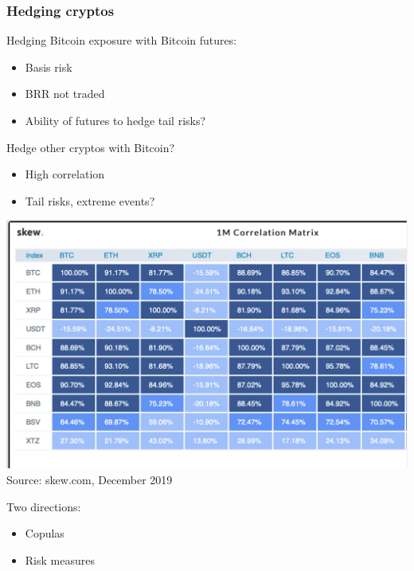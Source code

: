 \documentclass[10pt,mathserif]{beamer}
\renewcommand{\(}{\begin{columns}}
\renewcommand{\)}{\end{columns}}
\newcommand{\<}[1]{\begin{column}{#1}}
\renewcommand{\>}{\end{column}}
\theoremstyle{definition}
\begin{document}
\begin{frame}
  \frametitle{Hedging cryptos}
  \begin{itemize}
  \item Hedging Bitcoin exposure with Bitcoin futures: 
    \begin{itemize}
    \item Basis risk
    \item BRR not traded
    \item Ability of futures to hedge tail risks?
    \end{itemize}
    \pause
    \begin{minipage}[t]{.525\linewidth}
    \item Hedge other cryptos with Bitcoin?
      \begin{itemize}
      \item High correlation
      \item Tail risks, extreme events?
      \end{itemize}
    \end{minipage}
    \begin{minipage}[t]{.45\linewidth}
      \begin{center}
        \includegraphics[scale=.125]{../_pics/SkewCorrelation.pdf}\\
        \hfill{\tiny Source: skew.com, December 2019}
      \end{center}
    \end{minipage}
    \vspace*{-4\baselineskip}
    \pause
    \item Two directions:
      \begin{itemize}
      \item Copulas
      \item Risk measures
      \end{itemize}
  \end{itemize}
\end{frame}
\end{document}
